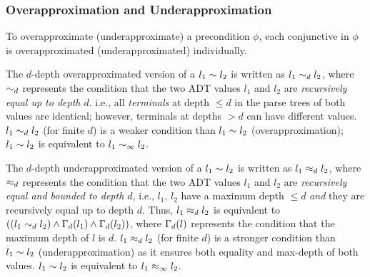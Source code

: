 
\vspace{-6px}
\subsubsection{Overapproximation and Underapproximation}
To overapproximate (underapproximate)
a precondition $\phi$, each
conjunctive \recursiveRelation{} in $\phi$ is overapproximated (underapproximated)
individually.

The $d$-depth overapproximated
version of a \recursiveRelation{}
$l_1\sim{}l_2$ is written as $l_1\sim_d l_2$, where
$\sim_d$ represents the condition that the two ADT values
$l_1$ and $l_2$ are {\em recursively equal up to depth $d$}. i.e., all
{\em terminals} at depth $\leq d$ in the parse trees of both values
are identical; however, terminals at depths $>d$ can have
different values.
$l_1\sim_dl_2$ (for finite $d$) is a weaker
condition than $l_1\sim{}l_2$ (overapproximation);
$l_1\sim{}l_2$
is equivalent to
$l_1\sim_\infty l_2$.

The $d$-depth underapproximated
version of a \recursiveRelation{}
$l_1\sim{}l_2$ is written
as $l_1\approx_dl_2$, where $\approx_d$ represents
the condition that the two ADT values $l_1$ and $l_2$ are
{\em recursively equal and bounded to depth $d$}, i.e.,
$l_1$, $l_2$ have a maximum
depth $\leq d$ {\em and} they are recursively equal up to depth $d$.
Thus, $l_1\approx_dl_2$ is equivalent
to
$((l_1\sim_d l_2)\land\Gamma_d(l_1)\land\Gamma_d(l_2))$,
where $\Gamma_d(l)$ represents the condition that the maximum
depth of $l$ is $d$.
$l_1\approx_dl_2$ (for finite $d$)
is a stronger condition than $l_1\sim{}l_2$ (underapproximation)
as it ensures both equality and max-depth of both values.
$l_1\sim{}l_2$
is equivalent to
$l_1\approx_\infty l_2$.

